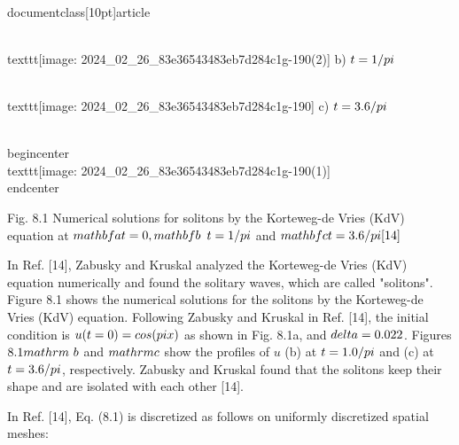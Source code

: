 \\documentclass[10pt]{article}
\begin{document}
{{{{\\texttt{[image: 2024\_02\_26\_83e36543483eb7d284c1g-190(2)]}
b) $t=1 / \\pi$

\\texttt{[image: 2024\_02\_26\_83e36543483eb7d284c1g-190]}
c) $t=3.6 / \\pi$

\\begin{center}
\\texttt{[image: 2024\_02\_26\_83e36543483eb7d284c1g-190(1)]}
\\end{center}

Fig. 8.1 Numerical solutions for solitons by the Korteweg-de Vries (KdV) equation at $\\mathbf{a} t=0, \\mathbf{b}$ $t=1 / \\pi$ and $\\mathbf{c} t=3.6 / \\pi[14]$

In Ref. [14], Zabusky and Kruskal analyzed the Korteweg-de Vries (KdV) equation numerically and found the solitary waves, which are called "solitons". Figure 8.1 shows the numerical solutions for the solitons by the Korteweg-de Vries (KdV) equation. Following Zabusky and Kruskal in Ref. [14], the initial condition is $u(t=0)=\\cos (\\pi x)$ as shown in Fig. 8.1a, and $\\delta=0.022$. Figures $8.1 \\mathrm{~b}$ and $\\mathrm{c}$ show the profiles of $u$ (b) at $t=1.0 / \\pi$ and (c) at $t=3.6 / \\pi$, respectively. Zabusky and Kruskal found that the solitons keep their shape and are isolated with each other [14].

In Ref. [14], Eq. (8.1) is discretized as follows on uniformly discretized spatial meshes:


}}}}
\end{document}
